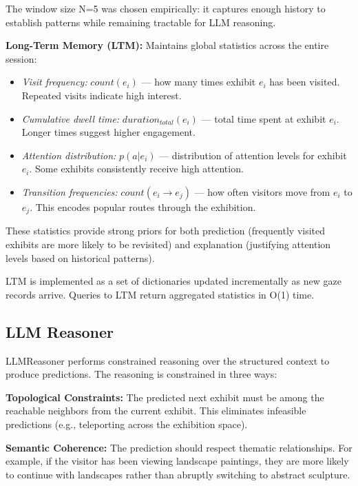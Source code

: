 \documentclass[letterpaper]{article}
\begin{document}
The window size N=5 was chosen empirically: it captures enough history to establish patterns while remaining tractable for LLM reasoning.

\textbf{Long-Term Memory (LTM):} Maintains global statistics across the entire session:

\begin{itemize}
    \item \textit{Visit frequency:} $count(e_i)$ — how many times exhibit $e_i$ has been visited. Repeated visits indicate high interest.
    \item \textit{Cumulative dwell time:} $duration_{total}(e_i)$ — total time spent at exhibit $e_i$. Longer times suggest higher engagement.
    \item \textit{Attention distribution:} $p(a|e_i)$ — distribution of attention levels for exhibit $e_i$. Some exhibits consistently receive high attention.
    \item \textit{Transition frequencies:} $count(e_i \rightarrow e_j)$ — how often visitors move from $e_i$ to $e_j$. This encodes popular routes through the exhibition.
\end{itemize}

These statistics provide strong priors for both prediction (frequently visited exhibits are more likely to be revisited) and explanation (justifying attention levels based on historical patterns).

LTM is implemented as a set of dictionaries updated incrementally as new gaze records arrive. Queries to LTM return aggregated statistics in O(1) time.

\subsection{LLM Reasoner}

LLMReasoner performs constrained reasoning over the structured context to produce predictions. The reasoning is constrained in three ways:

\textbf{Topological Constraints:} The predicted next exhibit must be among the reachable neighbors from the current exhibit. This eliminates infeasible predictions (e.g., teleporting across the exhibition space).

\textbf{Semantic Coherence:} The prediction should respect thematic relationships. For example, if the visitor has been viewing landscape paintings, they are more likely to continue with landscapes rather than abruptly switching to abstract sculpture.
\end{document}
